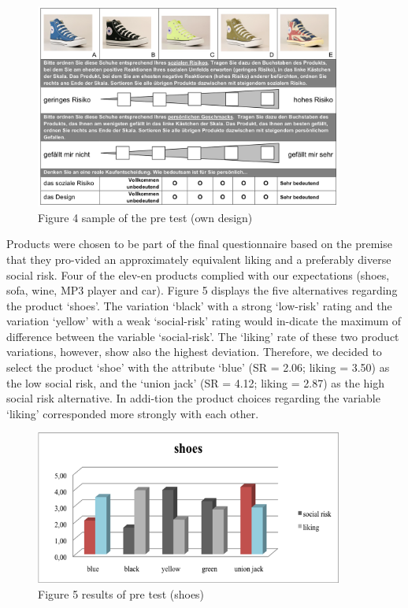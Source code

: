 \begin{figure}[h!]
\center
	\includegraphics[width=0.9\textwidth]{images/sample.png}
  \caption{Figure 4 sample of the pre test (own design)} \label{fig:sample}
\end{figure}
Products were chosen to be part of the final questionnaire based on the premise that they pro-vided an approximately equivalent liking and a preferably diverse social risk. Four of the elev-en products complied with our expectations (shoes, sofa, wine, MP3 player and car).  
Figure 5 displays the five alternatives regarding the product ‘shoes’. The variation ‘black’ with a strong ‘low-risk’ rating and the variation ‘yellow’ with a weak ‘social-risk’ rating would in-dicate the maximum of difference between the variable ‘social-risk’. The ‘liking’ rate of these two product variations, however, show also the highest deviation. Therefore, we decided to select the product ‘shoe’ with the attribute ‘blue’ (SR = 2.06; liking = 3.50) as the low social risk, and the ‘union jack’ (SR =  4.12; liking = 2.87) as the high social risk alternative. In addi-tion the product choices regarding the variable ‘liking’ corresponded more strongly with each other. 

\begin{figure}[h!]
\center
	\includegraphics[width=0.9\textwidth]{images/shoespretest.png}
  \caption{Figure 5 results of pre test (shoes)} \label{fig:shoespretest}
\end{figure}
